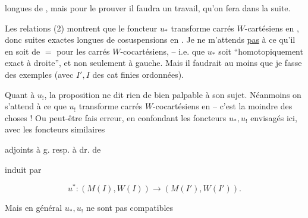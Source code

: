 
longues de , mais pour le prouver il faudra un travail, qu'on fera dans la suite.

Les relations (2) montrent que le foncteur $u_*$ transforme carrés $W$-cartésiens en , donc suites exactes longues de cosuspensions en . Je ne m'attends \uline{pas} à ce qu'il en soit de $=$  pour les carrés $W$-cocartésiens, -- i.e. que $u_*$ soit ``homotopiquement exact à droite'', et non seulement à gauche. Mais il faudrait au moins que je fasse des exemples (avec $I',I$ des cat finies ordonnées).

Quant à $u_!$, la proposition ne dit rien de bien palpable à son sujet. Néanmoins on s'attend à ce que $u_!$ transforme carrés $W$-cocartésiens en  -- c'est la moindre des choses ! Ou peut-être  fais erreur, en confondant les foncteurs $u_*,u_!$ envisagés ici, avec les foncteurs similaires 


adjoints à g. resp. à dr. de


induit par

\[ u^*:(M(I),W(I))\longrightarrow(M(I'),W(I')). \]

Mais en général $u_*,u_!$ ne sont pas compatibles
